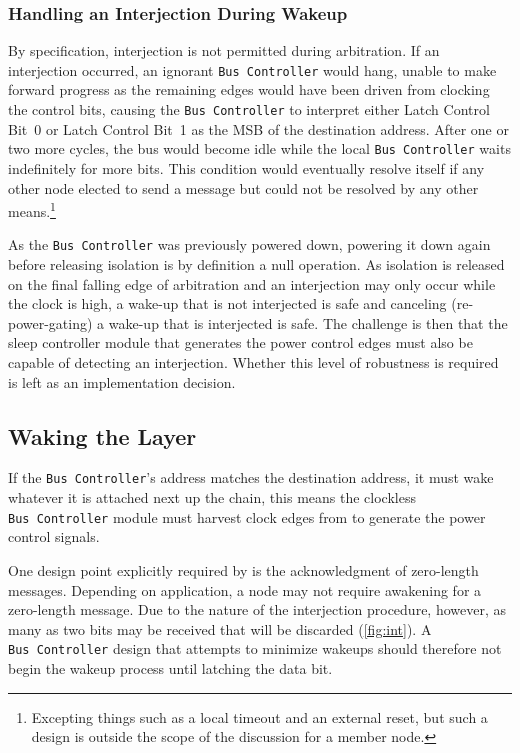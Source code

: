 \subsubsection{Handling an Interjection During Wakeup}
\label{sec:power-bus-controller-wakeup-int}
By specification, interjection is not permitted during arbitration. If an
interjection occurred, an ignorant {\tt Bus~Controller} would hang, unable to
make forward progress as the remaining edges would have been driven from
clocking the control bits, causing the {\tt Bus~Controller} to interpret
either Latch Control Bit~0 or Latch Control Bit~1 as the MSB of the
destination address. After one or two more cycles, the bus would become idle
while the local {\tt Bus~Controller} waits indefinitely for more bits. This
condition would eventually resolve itself if any other node elected to send a
message but could not be resolved by any other means.\footnote{
  Excepting things such as a local timeout and an external reset, but such
  a design is outside the scope of the discussion for a \bus member node.}

As the {\tt Bus~Controller} was previously powered down, powering it down
again before releasing isolation is by definition a null operation. As
isolation is released on the final falling edge of arbitration and an
interjection may only occur while the clock is high, a wake-up that is not
interjected is safe and canceling (re-power-gating) a wake-up that is
interjected is safe.  The challenge is then that the sleep controller module
that generates the power control edges must also be capable of detecting an
interjection. Whether this level of robustness is required is left as an
implementation decision.

\subsection{Waking the Layer}
If the {\tt Bus~Controller}'s address matches the destination address, it must
wake whatever it is attached next up the chain, this means the clockless
{\tt Bus~Controller} module must harvest clock edges from \bus to generate the
power control signals.

One design point explicitly required by \bus is the acknowledgment of
zero-length messages. Depending on application, a node may not require
awakening for a zero-length message. Due to the nature of the \bus
interjection procedure, however, as many as two bits may be received that will
be discarded (\cref{fig:int}). A {\tt Bus~Controller} design that attempts to
minimize wakeups should therefore not begin the wakeup process until latching
the {\em {}} data bit.


